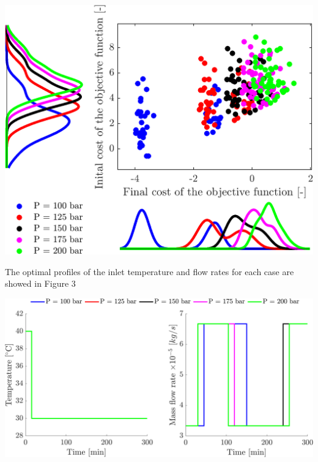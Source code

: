 \documentclass[a0,portrait]{a0poster}
\begin{document}
\begin{multicols}{2}
\begin{tcolorbox}[width=\linewidth, boxrule=0mm, sharp corners=all, colback=white]
	\begin{center}\vspace{0.5cm}
		\includegraphics[width=\linewidth]{scatter.png}
	\end{center}%
	
	The optimal profiles of the inlet temperature and flow rates for each case are showed in Figure 3
	
	\begin{center}\vspace{0.5cm}
		\includegraphics[width=\linewidth]{Profiles.png}
	\end{center}%
	
\end{tcolorbox}


\end{multicols}
\end{document}
